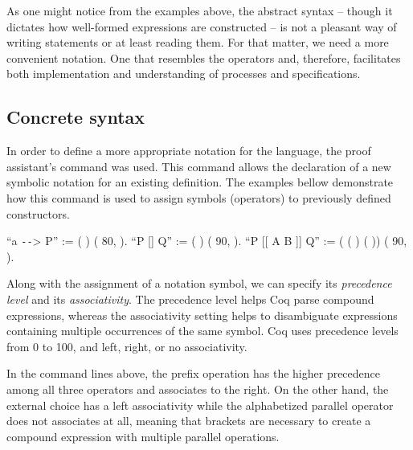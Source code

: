 As one might notice from the examples above, the abstract syntax -- though it dictates how well-formed expressions are constructed -- is not a pleasant way of writing statements or at least reading them. For that matter, we need a more convenient notation. One that resembles the \CSPM{} operators and, therefore, facilitates both implementation and understanding of \CSPcoq{} processes and specifications.

\subsection{Concrete syntax}

In order to define a more appropriate notation for the \CSPcoq{} language, the proof assistant's  command was used. This command allows the declaration of a new symbolic notation for an existing definition. The examples bellow demonstrate how this command is used to assign symbols (operators) to previously defined constructors.

\begin{coqdoccode}
	\coqdocnoindent
	 ``a \texttt{-{}-}> P'' := (  ) (  80,  ).\coqdoceol
	\coqdocnoindent
	 ``P [] Q'' := (  ) (  90,  ).\coqdoceol
	\coqdocnoindent
	 ``P [[ A  B ]] Q'' := (   ( ) ( )) (  90,  ).\coqdoceol
\end{coqdoccode}

Along with the assignment of a notation symbol, we can specify its \emph{precedence level} and its \emph{associativity}. The precedence level helps Coq parse compound expressions, whereas the associativity setting helps to disambiguate expressions containing multiple occurrences of the same symbol. Coq uses precedence levels from 0 to 100, and left, right, or no associativity.

In the command lines above, the prefix operation has the higher precedence among all three operators and associates to the right. On the other hand, the external choice has a left associativity while the alphabetized parallel operator does not associates at all, meaning that brackets are necessary to create a compound expression with multiple parallel operations.

